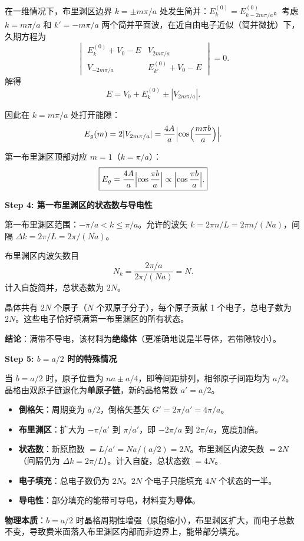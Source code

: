 \begin{derivationbox}[标准解题过程]
在一维情况下，布里渊区边界 $k=\pm m\pi/a$ 处发生简并：$E_k^{(0)}=E_{k-2m\pi/a}^{(0)}$。考虑 $k=m\pi/a$ 和 $k'=-m\pi/a$ 两个简并平面波，在近自由电子近似（简并微扰）下，久期方程为
\begin{equation}
\begin{vmatrix}
E_k^{(0)}+V_0-E & V_{2m\pi/a} \\[4pt]
V_{-2m\pi/a} & E_{k'}^{(0)}+V_0-E
\end{vmatrix}=0.
\end{equation}
解得
\begin{equation}
E=V_0+E_k^{(0)}\pm|V_{2m\pi/a}|.
\end{equation}

因此在 $k=m\pi/a$ 处打开能隙：
\begin{equation}
E_g(m)=2|V_{2m\pi/a}|=\frac{4A}{a}\Bigl|\cos\Bigl(\frac{m\pi b}{a}\Bigr)\Bigr|.
\end{equation}

第一布里渊区顶部对应 $m=1$（$k=\pi/a$）：
\begin{equation}
\boxed{E_g=\frac{4A}{a}\Bigl|\cos\frac{\pi b}{a}\Bigr|\propto\Bigl|\cos\frac{\pi b}{a}\Bigr|.}
\end{equation}

\textbf{Step 4: 第一布里渊区的状态数与导电性}

第一布里渊区范围：$-\pi/a<k\le\pi/a$。允许的波矢 $k=2\pi n/L=2\pi n/(Na)$，间隔 $\Delta k=2\pi/L=2\pi/(Na)$。

布里渊区内波矢数目
\begin{equation}
N_k=\frac{2\pi/a}{2\pi/(Na)}=N.
\end{equation}
计入自旋简并，总状态数为 $2N$。

晶体共有 $2N$ 个原子（$N$ 个双原子分子），每个原子贡献 1 个电子，总电子数为 $2N$。这些电子恰好填满第一布里渊区的所有状态。

\textbf{结论}：满带不导电，该材料为\textbf{绝缘体}（更准确地说是半导体，若带隙较小）。

\textbf{Step 5: $b=a/2$ 时的特殊情况}

当 $b=a/2$ 时，原子位置为 $na\pm a/4$，即等间距排列，相邻原子间距均为 $a/2$。晶格由双原子链退化为\textbf{单原子链}，新的晶格常数 $a'=a/2$。

\begin{itemize}
    \item \textbf{倒格矢}：周期变为 $a/2$，倒格矢基矢 $G'=2\pi/a'=4\pi/a$。
    \item \textbf{布里渊区}：扩大为 $-\pi/a'$ 到 $\pi/a'$，即 $-2\pi/a$ 到 $2\pi/a$，宽度加倍。
    \item \textbf{状态数}：新原胞数 $=L/a'=Na/(a/2)=2N$。布里渊区内波矢数 $=2N$（间隔仍为 $\Delta k=2\pi/L$）。计入自旋，总状态数 $=4N$。
    \item \textbf{电子填充}：总电子数仍为 $2N$。$2N$ 个电子只能填充 $4N$ 个状态的一半。
    \item \textbf{导电性}：部分填充的能带可导电，材料变为\textbf{导体}。
\end{itemize}

\textbf{物理本质}：$b=a/2$ 时晶格周期性增强（原胞缩小），布里渊区扩大，而电子总数不变，导致费米面落入布里渊区内部而非边界上，能带部分填充。
\end{derivationbox}

